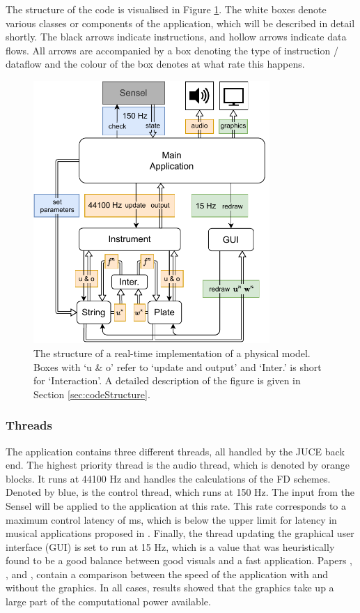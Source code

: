 The structure of the code is visualised in Figure \ref{fig:codeStructure}. The white boxes denote various classes or components of the application, which will be described in detail shortly. The black arrows indicate instructions, and hollow arrows indicate data flows. All arrows are accompanied by a box denoting the type of instruction / dataflow and the colour of the box denotes at what rate this happens.

\begin{figure}[h]
    \centering
    \includegraphics[width=0.8\textwidth]{figures/realtime/flowchart.pdf}
    \caption{The structure of a real-time implementation of a physical model. Boxes with `u \& o' refer to `update and output' and `Inter.' is short for `Interaction'. A detailed description of the figure is given in Section \ref{sec:codeStructure}.\label{fig:codeStructure}}
\end{figure}

\subsubsection{Threads}
The application contains three different threads, all handled by the JUCE back end. The highest priority thread is the audio thread, which is denoted by orange blocks. It runs at 44100 Hz and handles the calculations of the FD schemes. Denoted by blue, is the control thread, which runs at 150 Hz. The input from the Sensel will be applied to the application at this rate. This rate corresponds to a maximum control latency of  ms, which is below the upper limit for latency in musical applications proposed in \cite{Wessel2002}. Finally, the thread updating the graphical user interface (GUI) is set to run at 15 Hz, which is a value that was heuristically found to be a good balance between good visuals and a fast application. %
Papers \citeP[A], \citeP[C], and \citeP[H], contain a comparison between the speed of the application with and without the graphics. In all cases, results showed that the graphics take up a large part of the computational power available.

